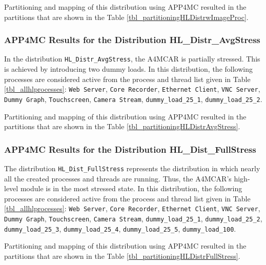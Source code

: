 Partitioning and mapping of this distribution using APP4MC resulted in the partitions that are shown in the Table \ref{tbl_partitioningHLDistrwImageProc}.

\partitioningHLDistrwImageProc


\subsubsection{APP4MC Results for the Distribution HL{\_}Distr{\_}AvgStress}

In the distribution \texttt{HL{\_}Distr{\_}AvgStress}, the A4MCAR is partially stressed. This is achieved by introducing two dummy loads. In this distribution, the following processes are considered active from the process and thread list given in Table \ref{tbl_allhlprocesses}: \texttt{Web Server}, \texttt{Core Recorder}, \texttt{Ethernet Client}, \texttt{VNC Server}, \texttt{Dummy Graph}, \texttt{Touchscreen}, \texttt{Camera Stream}, \texttt{dummy{\_}load{\_}25{\_}1}, \texttt{dummy{\_}load{\_}25{\_}2}.

Partitioning and mapping of this distribution using APP4MC resulted in the partitions that are shown in the Table \ref{tbl_partitioningHLDistrAvgStress}.

\partitioningHLDistrAvgStress


\subsubsection{APP4MC Results for the Distribution HL{\_}Dist{\_}FullStress}

The distribution \texttt{HL{\_}Dist{\_}FullStress} represents the distribution in which nearly all the created processes and threads are running. Thus, the A4MCAR's high-level module is in the most stressed state. In this distribution, the following processes are considered active from the process and thread list given in Table \ref{tbl_allhlprocesses}: \texttt{Web Server}, \texttt{Core Recorder}, \texttt{Ethernet Client}, \texttt{VNC Server}, \texttt{Dummy Graph}, \texttt{Touchscreen}, \texttt{Camera Stream}, \texttt{dummy{\_}load{\_}25{\_}1}, \texttt{dummy{\_}load{\_}25{\_}2}, \texttt{dummy{\_}load{\_}25{\_}3}, \texttt{dummy{\_}load{\_}25{\_}4}, \texttt{dummy{\_}load{\_}25{\_}5}, \texttt{dummy{\_}load{\_}100}.

Partitioning and mapping of this distribution using APP4MC resulted in the partitions that are shown in the Table \ref{tbl_partitioningHLDistrFullStress}.

